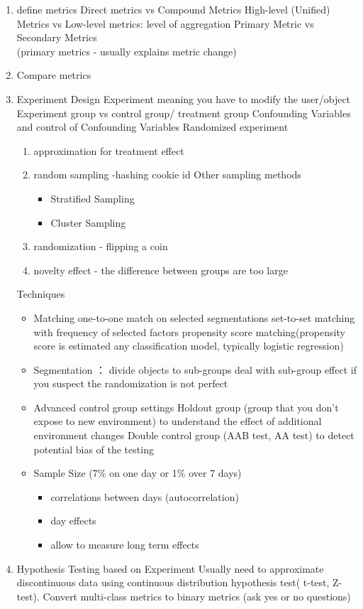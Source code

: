 \documentclass[11pt, openany]{book}              %
\begin{document}
\begin{enumerate}
	\item define metrics
		\subitem Direct metrics vs Compound Metrics
		\subitem High-level (Unified) Metrics vs Low-level metrics: level of aggregation
		\subitem Primary Metric vs Secondary Metrics \\
			(primary metrics - usually explains metric change)
	\item Compare metrics
	\item Experiment Design
		\subitem Experiment meaning you have to modify the user/object
		\subitem Experiment group vs control group/ treatment group
		\subitem Confounding Variables and control of Confounding Variables
		\subitem Randomized experiment 
		\begin{enumerate}
			\item approximation for treatment effect
			\item random sampling -hashing cookie id
			\subitem Other sampling methods
				\begin{itemize}
					\item Stratified Sampling
					\item Cluster Sampling
				\end{itemize}

			\item randomization - flipping a coin 
			\item novelty effect - the difference between groups are too large
		\end{enumerate}
		\subitem Techniques
			\begin{itemize}
				\item Matching
					\subitem one-to-one match on selected segmentations
					\subitem set-to-set matching with frequency of selected factors
					\subitem propensity score matching(propensity score is estimated any classification model, typically logistic regression)
				\item Segmentation ： divide objects to sub-groups
						\subitem deal with sub-group effect
						\subitem if you suspect the randomization is not perfect
				\item Advanced control group settings
					\subitem Holdout group (group that you don't expose to new environment) to understand the effect of additional environment changes
					\subitem Double control group (AAB test, AA test) to detect potential bias of the testing
				\item Sample Size (7\% on one day or 1\% over 7 days)
				\begin{itemize}
					\item correlations between days (autocorrelation)
					\item day effects
					\item allow to measure long term effects
				\end{itemize}
			\end{itemize}
	\item Hypothesis Testing based on Experiment
		\subitem Usually need to approximate discontinuous data using continuous distribution hypothesis test( t-test, Z-test). Convert multi-class metrics to binary metrics (ask yes or no questions)
\end{enumerate}
\end{document}

